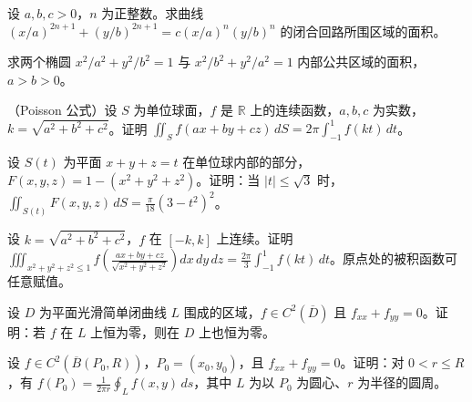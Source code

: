 \noindent\begin{minipage}{\textwidth}
设 $a,b,c>0$，$n$ 为正整数。求曲线 $\displaystyle(x/a)^{2n+1}+(y/b)^{2n+1}=c(x/a)^n(y/b)^n$ 的闭合回路所围区域的面积。
\end{minipage}\par\vfill
\noindent\begin{minipage}{\textwidth}
求两个椭圆 $x^2/a^2+y^2/b^2=1$ 与 $x^2/b^2+y^2/a^2=1$ 内部公共区域的面积，$a>b>0$。
\end{minipage}\par\vfill
\noindent\begin{minipage}{\textwidth}
（Poisson 公式）设 $S$ 为单位球面，$f$ 是 $\mathbb R$ 上的连续函数，$a,b,c$ 为实数，$k=\sqrt{a^2+b^2+c^2}$。证明 $\displaystyle\iint_Sf(ax+by+cz)\,dS=2\pi\int_{-1}^{1}f(kt)\,dt$。
\end{minipage}\par\vfill
\newpage
\noindent\begin{minipage}{\textwidth}
设 $S(t)$ 为平面 $x+y+z=t$ 在单位球内部的部分，$F(x,y,z)=1-(x^2+y^2+z^2)$。证明：当 $|t|\le\sqrt3$ 时，$\displaystyle\iint_{S(t)}F(x,y,z)\,dS=\frac{\pi}{18}(3-t^2)^2$。
\end{minipage}\par\vfill
\noindent\begin{minipage}{\textwidth}
设 $k=\sqrt{a^2+b^2+c^2}$，$f$ 在 $[-k,k]$ 上连续。证明 $\displaystyle\iiint_{x^2+y^2+z^2\le1}f\!\left(\frac{ax+by+cz}{\sqrt{x^2+y^2+z^2}}\right)dx\,dy\,dz=\frac{2\pi}{3}\int_{-1}^{1}f(kt)\,dt$。原点处的被积函数可任意赋值。
\end{minipage}\par\vfill
\noindent\begin{minipage}{\textwidth}
设 $D$ 为平面光滑简单闭曲线 $L$ 围成的区域，$f\in C^2(\overline D)$ 且 $f_{xx}+f_{yy}=0$。证明：若 $f$ 在 $L$ 上恒为零，则在 $D$ 上也恒为零。
\end{minipage}\par\vfill
\noindent\begin{minipage}{\textwidth}
设 $f\in C^2(\overline B(P_0,R))$，$P_0=(x_0,y_0)$，且 $f_{xx}+f_{yy}=0$。证明：对 $0<r\le R$，有 $\displaystyle f(P_0)=\frac1{2\pi r}\oint_Lf(x,y)\,ds$，其中 $L$ 为以 $P_0$ 为圆心、$r$ 为半径的圆周。
\end{minipage}\par\vfill
